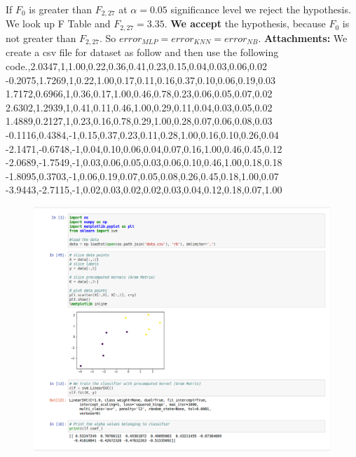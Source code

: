 \documentclass[12pt]{article}
\begin{document}
If $F_0$ is greater than $F_{2,27}$ at $\alpha=0.05$ significance level we reject the hypothesis. We look up F Table and $F_{2,27} = 3.35$. \textbf{We accept} the hypothesis, because $F_0$ is not greater than $F_{2,27}$. So $error_{MLP} = error_{KNN} = error_{NB}$.
\newpage
\textbf{Attachments:}
We create a csv file for dataset as follow and then use the following code.,2.0347,1,1.00,0.22,0.36,0.41,0.23,0.15,0.04,0.03,0.06,0.02\\
-0.2075,1.7269,1,0.22,1.00,0.17,0.11,0.16,0.37,0.10,0.06,0.19,0.03\\
1.7172,0.6966,1,0.36,0.17,1.00,0.46,0.78,0.23,0.06,0.05,0.07,0.02\\
2.6302,1.2939,1,0.41,0.11,0.46,1.00,0.29,0.11,0.04,0.03,0.05,0.02\\
1.4889,0.2127,1,0.23,0.16,0.78,0.29,1.00,0.28,0.07,0.06,0.08,0.03\\
-0.1116,0.4384,-1,0.15,0.37,0.23,0.11,0.28,1.00,0.16,0.10,0.26,0.04\\
-2.1471,-0.6748,-1,0.04,0.10,0.06,0.04,0.07,0.16,1.00,0.46,0.45,0.12\\
-2.0689,-1.7549,-1,0.03,0.06,0.05,0.03,0.06,0.10,0.46,1.00,0.18,0.18\\
-1.8095,0.3703,-1,0.06,0.19,0.07,0.05,0.08,0.26,0.45,0.18,1.00,0.07\\
-3.9443,-2.7115,-1,0.02,0.03,0.02,0.02,0.03,0.04,0.12,0.18,0.07,1.00\\


\begin{figure}[h!] 
	\begin{center}
		\includegraphics[width=\textwidth]{hw.png}
		\label{fig:test}
	\end{center}
\end{figure}  
\end{document}
